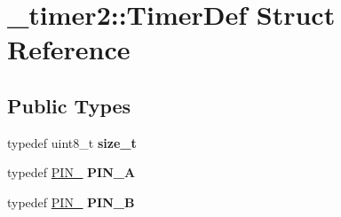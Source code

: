 \hypertarget{struct__timer2_1_1TimerDef}{}\section{\+\_\+timer2\+:\+:Timer\+Def Struct Reference}
\label{struct__timer2_1_1TimerDef}
\subsection*{Public Types}
\begin{DoxyCompactItemize}
\item 
typedef uint8\+\_\+t {\bfseries size\+\_\+t}\hypertarget{struct__timer2_1_1TimerDef_a4de2d0355f8365156f840b61eb29907d}{}\label{struct__timer2_1_1TimerDef_a4de2d0355f8365156f840b61eb29907d}

\item 
typedef \hyperlink{structports_1_1Pin}{P\+I\+N\+\_} {\bfseries P\+I\+N\+\_\+A}\hypertarget{struct__timer2_1_1TimerDef_acfaae68213dbf4d8e66001bdcfd4938c}{}\label{struct__timer2_1_1TimerDef_acfaae68213dbf4d8e66001bdcfd4938c}

\item 
typedef \hyperlink{structports_1_1Pin}{P\+I\+N\+\_} {\bfseries P\+I\+N\+\_\+B}\hypertarget{struct__timer2_1_1TimerDef_af4f3372005a05f2aa242f3d3fb942267}{}\label{struct__timer2_1_1TimerDef_af4f3372005a05f2aa242f3d3fb942267}

\end{DoxyCompactItemize}
